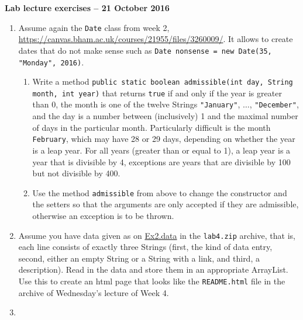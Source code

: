\documentclass[12pt]{article}
\newcommand{\myhead}[1]{\begin{center}\large\bf #1\end{center}}
\begin{document}
\myhead{Lab lecture exercises -- 21 October 2016}
\begin{enumerate}

\item Assume again the \texttt{Date} class from week 2,
  \url{https://canvas.bham.ac.uk/courses/21955/files/3260009/}. It
  allows to create dates that do not make sense such as \texttt{Date
    nonsense = new Date(35, "Monday", 2016)}.  
  \begin{enumerate}
  \item Write a method \texttt{public static boolean admissible(int
      day, String month, int year)} that returns \texttt{true} if and
    only if the year is greater than 0, the month is one of the twelve
    Strings \texttt{"January"}, $\ldots$, \texttt{"December"}, and the
    day is a number between (inclusively) 1 and the maximal number of
    days in the particular month. Particularly difficult is the month
    \texttt{February}, which may have 28 or 29 days, depending on
    whether the year is a leap year. For all years (greater than or
    equal to 1), a leap year is a year that is divisible by 4,
    exceptions are years that are divisible by 100 but not divisible
    by 400.
  \item Use the method \texttt{admissible} from above to change the
    constructor and the setters so that the arguments are only
    accepted if they are admissible, otherwise an exception is to be
    thrown.
  \end{enumerate}

\item Assume you have data given as on \url{Ex2.data} in the
  \texttt{lab4.zip} archive, that is, each line consists of exactly
  three Strings (first, the kind of data entry, second, either an
  empty String or a String with a link, and third, a description).
  Read in the data and store them in an appropriate ArrayList. Use
  this to create an html page that looks like the \texttt{README.html}
  file in the archive of Wednesday's lecture of Week 4.

\item


\end{enumerate}
\end{document}
